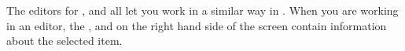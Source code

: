 The editors for \gdcases{}, \gdsuites{} and \gdjobs{} all let you work in a similar way in \app{}. When you are working in an editor, the \gdpropview{}, \gddatasetsview{} and \gdcompnamesview{} on the right hand side of the screen contain information about the selected item. 

